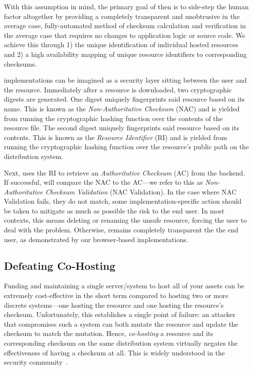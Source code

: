 With this assumption in mind, the primary goal of \SYSTEM{} then is to side-step
the human factor altogether by providing a completely transparent and
unobtrusive in the average case, fully-automated method of checksum calculation
and verification in the average case that requires no changes to application
logic or source code. We achieve this through 1) the unique identification of
individual hosted resources and 2) a high availability mapping of unique
resource identifiers to corresponding checksums.

\SYSTEM{} implementations can be imagined as a security layer sitting between
the user and the resource. Immediately after a resource is downloaded, two
cryptographic digests are generated. One digest uniquely fingerprints said
resource based on its name. This is known as the \emph{Non-Authoritative
Checksum} (NAC) and is yielded from running the cryptographic hashing function
over the contents of the resource file. The second digest uniquely fingerprints
said resource based on its contents. This is known as the \emph{Resource
Identifier} (RI) and is yielded from running the cryptographic hashing function
over the resource's public path on the distribution system.

Next, \SYSTEM{} uses the RI to retrieve an \emph{Authoritative Checksum} (AC)
from the backend. If successful, \SYSTEM{} will compare the NAC to the AC---we
refer to this as \emph{Non-Authoritative Checksum Validation} (NAC Validation).
In the case where NAC Validation fails, \ie they do not match, some
implementation-specific action should be taken to mitigate as much as possible
the risk to the end user. In most contexts, this means deleting or renaming the
unsafe resource, forcing the user to deal with the problem. Otherwise, \SYSTEM{}
remains completely transparent the the end user, as demonstrated by our
browser-based implementations.

\subsection{Defeating Co-Hosting}

Funding and maintaining a single server/system to host all of your assets can be
extremely cost-effective in the short term compared to hosting two or more
discrete systems---one hosting the resource and one hosting the resource's
checksum. Unfortunately, this establishes a single point of failure: an attacker
that compromises such a system can both mutate the resource and update the
checksum to match the mutation. Hence, \emph{co-hosting} a resource and its
corresponding checksum on the same distribution system virtually negates the
effectiveness of having a checksum at all. This is widely understood in the
security community~\cite{SCA-MINT2}.

